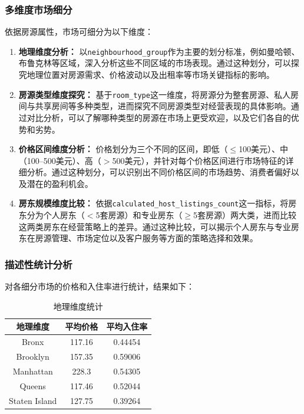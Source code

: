 \documentclass[12pt]{article}
\begin{document}
\begin{CJK}{UTF8}{gbsn}
	\subsubsection{多维度市场细分}
	依据房源属性，市场可细分为以下维度：
	\begin{enumerate}
		\item \textbf{地理维度分析：} 以\texttt{neighbourhood\_group}作为主要的划分标准，例如曼哈顿、布鲁克林等区域，深入分析这些不同区域的市场表现。通过这种划分，可以探究地理位置对房源需求、价格波动以及出租率等市场关键指标的影响。
		\item \textbf{房源类型维度探究：} 基于\texttt{room\_type}这一维度，将房源分为整套房源、私人房间与共享房间等多种类型，进而探究不同房源类型对经营表现的具体影响。通过对比分析，可以了解哪种类型的房源在市场上更受欢迎，以及它们各自的优势和劣势。
		\item \textbf{价格区间维度分析：} 价格划分为三个不同的区间，即低（$\le$100美元）、中（100–500美元）、高（$>$500美元），并针对每个价格区间进行市场特征的详细分析。通过这种划分，可以识别出不同价格区间的市场趋势、消费者偏好以及潜在的盈利机会。
		\item \textbf{房东规模维度比较：} 依据\texttt{calculated\_host\_listings\_count}这一指标，将房东分为个人房东（$<$5套房源）和专业房东（$\ge$5套房源）两大类，进而比较这两类房东在经营策略上的差异。通过这种比较，可以揭示个人房东与专业房东在房源管理、市场定位以及客户服务等方面的策略选择和效果。
	\end{enumerate}
	
	\subsubsection{描述性统计分析}
	对各细分市场的价格和入住率进行统计，结果如下：
	
	\begin{table}[h!]
		\centering
		\begin{tabular*}{\textwidth}{@{\extracolsep{\fill}} ccc }
			\toprule
			\textbf{地理维度} & \textbf{平均价格} & \textbf{平均入住率} \\
			\midrule
			Bronx & 117.16 & 0.44454 \\
			Brooklyn & 157.35 & 0.59006 \\
			Manhattan & 228.3 & 0.54305 \\
			Queens & 117.46 & 0.52044 \\
			Staten Island & 127.75 & 0.39264 \\
			\bottomrule
		\end{tabular*}
		\caption{地理维度统计}
	\end{table}
	

\end{CJK}
\end{document}
